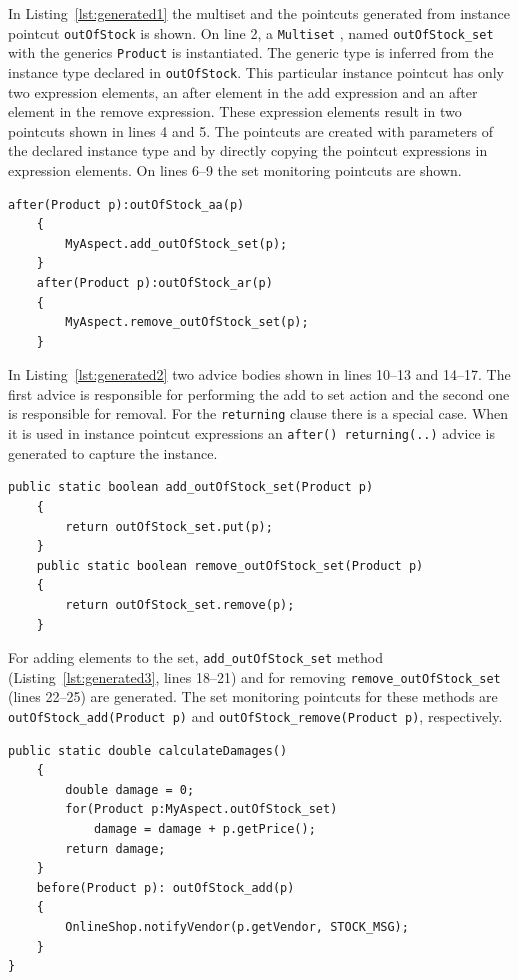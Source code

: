 \documentclass{acm_proc_article-sp}
\begin{document}
In Listing~\ref{lst:generated1} the multiset and the pointcuts generated from instance pointcut \texttt{outOfStock} is shown. On line 2, a \texttt{Multiset} \cite{bourrillionguava}, named \texttt{outOfStock_set} with the generics \texttt{Product} is instantiated. The generic type is inferred from the instance type declared in \texttt{outOfStock}. This particular instance pointcut has only two expression elements, an after element in the add expression and an after element in the remove expression. These expression elements result in two pointcuts shown in lines 4 and 5. The pointcuts are created with parameters of the declared instance type and by directly copying the pointcut expressions in expression elements. On lines 6--9 the set monitoring pointcuts are shown.

\begin{lstlisting}[float=h!,firstnumber = {10}, caption={The generated AspectJ advices from \texttt{outOfStock} instance pointcut}, label={lst:generated2}]	
	after(Product p):outOfStock_aa(p)
	{
		MyAspect.add_outOfStock_set(p);
	}
	after(Product p):outOfStock_ar(p)
	{
		MyAspect.remove_outOfStock_set(p);
	}
\end{lstlisting}	

In Listing~\ref{lst:generated2} two advice bodies shown in lines 10--13 and 14--17. The first advice is responsible for performing the add to set action and the second one is responsible for removal. For the \texttt{returning} clause there is a special case. When it is used in instance pointcut expressions an \texttt{after() returning(..)} advice is generated to capture the instance. 

\begin{lstlisting}[float=h!, firstnumber = {18},caption={The set add/remove methods for \texttt{outOfStock} instance pointcut}, label={lst:generated3}]		
	public static boolean add_outOfStock_set(Product p)
	{
		return outOfStock_set.put(p);
	}
	public static boolean remove_outOfStock_set(Product p)
	{
		return outOfStock_set.remove(p);
	}
\end{lstlisting}


For adding elements to the set, \texttt{add_outOfStock_set} method (Listing~\ref{lst:generated3}, lines 18--21) and for removing \texttt{remove_outOfStock_set} (lines 22--25) are generated. The set monitoring pointcuts for these methods are \texttt{outOfStock_add(Product p)} and \texttt{outOfStock_remove(Product p)}, respectively. 


\begin{lstlisting}[float=h!, firstnumber = {26},caption={The examples from Listing~\ref{lst:setaccess} and Listing~\ref{lst:monitor1}}, label={lst:generated4}]	
	public static double calculateDamages()
	{
		double damage = 0;
		for(Product p:MyAspect.outOfStock_set)
			damage = damage + p.getPrice();
		return damage;
	}
	before(Product p): outOfStock_add(p)
	{
		OnlineShop.notifyVendor(p.getVendor, STOCK_MSG);
	}
}
\end{lstlisting}
\end{document}
